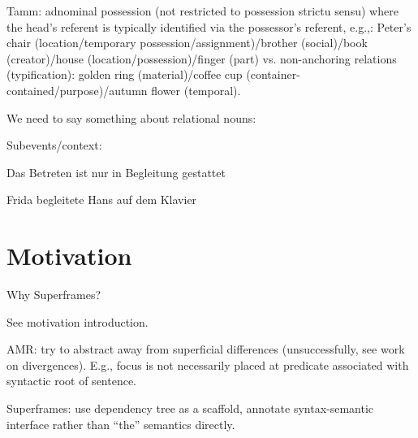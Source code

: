 \documentclass[a4paper]{article}
\begin{document}
Tamm: adnominal possession (not restricted to possession strictu sensu) where
the head's referent is typically identified via the possessor's referent,
e.g.,: Peter's chair (location/temporary possession/assignment)/brother
(social)/book (creator)/house (location/possession)/finger (part) vs.
non-anchoring relations (typification): golden ring (material)/coffee cup
(container-contained/purpose)/autumn flower (temporal).

We need to say something about relational nouns:


Subevents/context:

Das Betreten ist nur in Begleitung gestattet

Frida begleitete Hans auf dem Klavier


\section{Motivation}

Why Superframes?

See motivation introduction.

AMR: try to abstract away from superficial differences (unsuccessfully, see work on divergences). E.g., focus is not necessarily placed at predicate associated with syntactic root of sentence.

Superframes: use dependency tree as a scaffold, annotate syntax-semantic interface rather than ``the'' semantics directly.

\clearpage



\end{document}
